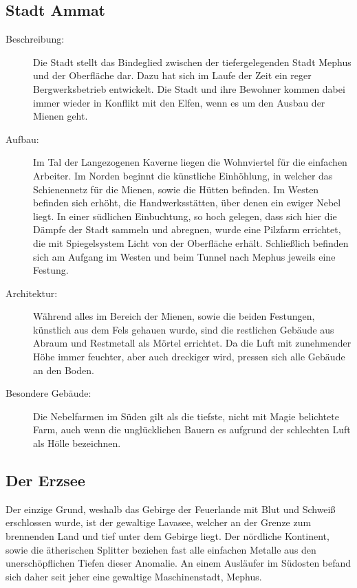 \documentclass[a4paper,12pt,oneside]{book}
\begin{document}
\subsection{Stadt Ammat}
\begin{description}
\item[Beschreibung:]Die Stadt stellt das Bindeglied zwischen der tiefergelegenden Stadt Mephus und der Oberfläche dar. Dazu hat sich im Laufe der Zeit ein reger Bergwerksbetrieb entwickelt. Die Stadt und ihre Bewohner kommen dabei immer wieder in Konflikt mit den Elfen, wenn es um den Ausbau der Mienen geht.
\item[Aufbau:]Im Tal der Langezogenen Kaverne liegen die Wohnviertel für die einfachen Arbeiter. Im Norden beginnt die künstliche Einhöhlung, in welcher das Schienennetz für die Mienen, sowie die Hütten befinden. Im Westen befinden sich erhöht, die Handwerksstätten, über denen ein ewiger Nebel liegt. In einer südlichen Einbuchtung, so hoch gelegen, dass sich hier die Dämpfe der Stadt sammeln und abregnen, wurde eine Pilzfarm errichtet, die mit Spiegelsystem Licht von der Oberfläche erhält. Schließlich befinden sich am Aufgang im Westen und beim Tunnel nach Mephus jeweils eine Festung.
\item[Architektur:]Während alles im Bereich der Mienen, sowie die beiden Festungen, künstlich aus dem Fels gehauen wurde, sind die restlichen Gebäude aus Abraum und Restmetall als Mörtel errichtet. Da die Luft mit zunehmender Höhe immer feuchter, aber auch dreckiger wird, pressen sich alle Gebäude an den Boden.
\item[Besondere Gebäude:] Die Nebelfarmen im Süden gilt als die tiefste, nicht mit Magie belichtete Farm, auch wenn die unglücklichen Bauern es aufgrund der schlechten Luft als Hölle bezeichnen.
\end{description}

\subsection{Der Erzsee}
Der einzige Grund, weshalb das Gebirge der Feuerlande mit Blut und Schweiß erschlossen wurde, ist der gewaltige Lavasee, welcher an der Grenze zum brennenden Land und tief unter dem Gebirge liegt. Der nördliche Kontinent, sowie die ätherischen Splitter beziehen fast alle einfachen Metalle aus den unerschöpflichen Tiefen dieser Anomalie. An einem Ausläufer im Südosten befand sich daher seit jeher eine gewaltige Maschinenstadt, Mephus.
\end{document}
